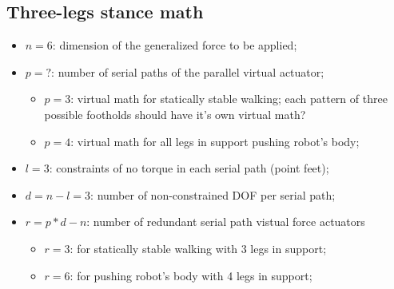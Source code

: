\documentclass[]{article}
\begin{document}
\subsection{Three-legs stance math}
\begin{itemize}
	\item $n=6$: dimension of the generalized force to be applied;
	\item $p=?$: number of serial paths of the parallel virtual actuator;
	\begin{itemize}
		\item $p=$3: virtual math for statically stable walking; each pattern of three possible footholds should have it's own virtual math?
		\item $p=4$: virtual math for all legs in support pushing robot's body;
	\end{itemize}
	\item $l=3$: constraints of no torque in each serial path (point feet);
	\item $d=n-l=3$: number of non-constrained DOF per serial path;
	\item $r=p*d-n$: number of redundant serial path vistual force actuators
	\begin{itemize}
		\item $r=3$: for statically stable walking with 3 legs in support;
		\item $r=6$: for pushing robot's body with 4 legs in support;
	\end{itemize}
\end{itemize}
\end{document}
